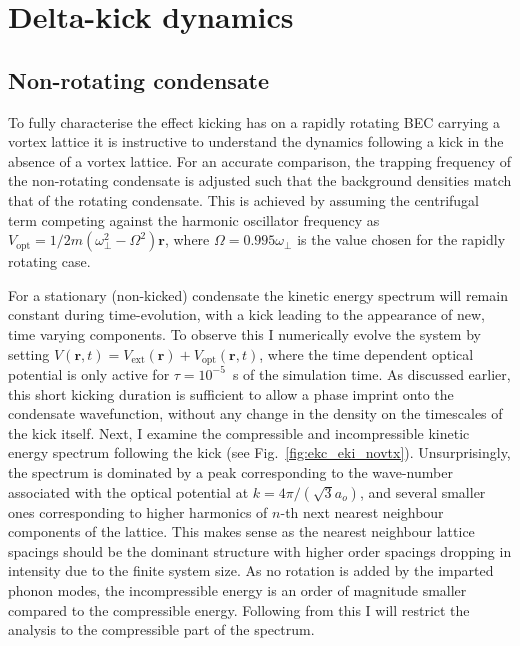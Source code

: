 \section{Delta-kick dynamics}\label{sec:kickvl}
\subsection{Non-rotating condensate}
To fully characterise the effect kicking has on a rapidly rotating BEC carrying a vortex lattice it is instructive to understand the dynamics following a kick in the absence of a vortex lattice. For an accurate comparison, the trapping frequency of the non-rotating condensate is adjusted such that the background densities match that of the rotating condensate. This is achieved by assuming the centrifugal term competing against the harmonic oscillator frequency as $V_{\text{opt}} = 1/2m(\omega^2_\perp - \Omega^2)\mathbf
{r}$, where $\Omega=0.995\omega_\perp$ is the value chosen for the rapidly rotating case.

For a stationary (non-kicked) condensate the kinetic energy spectrum will remain constant during time-evolution, with a kick leading to the appearance of new, time varying components. To observe this I numerically evolve the system by setting $V(\mathbf{r},t) = V_{\text{ext}}(\mathbf{r}) + V_{\text{opt}}(\mathbf{r},t)$, where the time dependent optical potential is only active for $\tau=10^{-5}$~s of the simulation time. As discussed earlier, this short kicking duration is sufficient to allow a phase imprint onto the condensate wavefunction, without any change in the density on the timescales of the kick itself. Next, I examine the compressible and incompressible kinetic energy spectrum following the kick (see Fig.~\ref{fig:ekc_eki_novtx}). Unsurprisingly, the spectrum is dominated by a peak corresponding to the wave-number associated with the optical potential at $k=4\pi/(\sqrt{3}a_o)$, and several smaller ones corresponding to higher harmonics of $n$-th next nearest neighbour components of the lattice. This makes sense as the nearest neighbour lattice spacings should be the dominant structure with higher order spacings dropping in intensity due to the finite system size. As no rotation is added by the imparted phonon modes, the incompressible energy is an order of magnitude smaller compared to the compressible energy. Following from this I will restrict the analysis to the compressible part of the spectrum.

